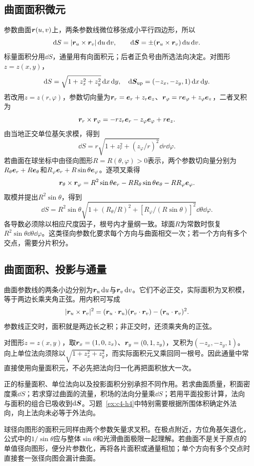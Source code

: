 \subsection{曲面面积微元}
参数曲面$\bm{r}(u,v)$上，两条参数线微位移张成小平行四边形，所以
\[\mathop{}\!\mathrm d S=|\bm{r}_u\times\bm{r}_v|\mathop{}\!\mathrm d u\mathop{}\!\mathrm d v,\qquad
\mathop{}\!\mathrm d\bm{S}=\pm(\bm{r}_u\times\bm{r}_v)\mathop{}\!\mathrm d u\mathop{}\!\mathrm d v.
\]
标量面积分用$\dd S$，通量用有向面积元；后者正负号由所选法向决定。对图形$z=z(x,y)$，
\[\mathop{}\!\mathrm d S=\sqrt{1+z_x^2+z_y^2}\mathop{}\!\mathrm d x\mathop{}\!\mathrm d y,\quad
\mathop{}\!\mathrm d\bm{S}_{\rm up}=(-z_x,-z_y,1)\mathop{}\!\mathrm d x\mathop{}\!\mathrm d y.
\]
若改用$z=z(r,\varphi)$，参数切向量为$\bm{r}_r=\bm{e}_r+z_r\bm{e}_z$、$\bm{r}_\varphi=r\bm{e}_\varphi+z_\varphi\bm{e}_z$，二者叉积为
\[\bm{r}_r\times\bm{r}_\varphi
=-rz_r\bm{e}_r-z_\varphi\bm{e}_\varphi+r\bm{e}_z.\]
由当地正交单位基矢求模，得到
\[\dd S=r\sqrt{1+z_r^2+(z_\varphi/r)^2}\dd r\dd\varphi.
\]
若曲面在球坐标中由径向图形$R=R(\theta,\varphi)>0$表示，两个参数切向量分别为$R_\theta\bm{e}_r+R\bm{e}_\theta$和$R_\varphi\bm{e}_r+R\sin\theta\bm{e}_\varphi$。逐项叉乘得
\[\bm{r}_\theta\times\bm{r}_\varphi
=R^2\sin\theta\bm{e}_r-RR_\theta\sin\theta\bm{e}_\theta-RR_\varphi\bm{e}_\varphi.\]
取模并提出$R^2\sin\theta$，得到
\[\boxed{\dd S=R^2\sin\theta\sqrt{1+(R_\theta/R)^2+[R_\varphi/(R\sin\theta)]^2}\dd\theta\dd\varphi}.
\]
各导数必须除以相应尺度因子，根号内才量纲一致。球面$R$为常数时恢复$R^2\sin\theta\dd\theta\dd\varphi$。这类径向参数化要求每个方向与曲面相交一次；若一个方向有多个交点，需要分片积分。

\subsection{曲面面积、投影与通量}
曲面参数线的两条小边分别为$\bm{r}_u\mathop{}\!\mathrm d u$与$\bm{r}_v\mathop{}\!\mathrm d v$。它们不必正交，实际面积为叉积模，等于两边长乘夹角正弦。用内积可写成
\[|\bm{r}_u\times\bm{r}_v|^2
=(\bm{r}_u\cdot\bm{r}_u)(\bm{r}_v\cdot\bm{r}_v)
-(\bm{r}_u\cdot\bm{r}_v)^2.\]
参数线正交时，面积就是两边长之积；非正交时，还须乘夹角的正弦。

对图形$z=z(x,y)$，取$\bm{r}_x=(1,0,z_x)$、$\bm{r}_y=(0,1,z_y)$，叉积为$(-z_x,-z_y,1)$。向上单位法向须除以$\sqrt{1+z_x^2+z_y^2}$，而实际面积元又乘回同一根号。因此通量中常直接使用向量面积元，不必先把法向归一化再把面积放大一次。

正的标量面积、单位法向以及投影面积分别承担不同作用。若求曲面质量，积面密度乘$\dd S$；若求穿过曲面的流量，积场的法向分量乘$\dd S$；若用平面投影计算，法向与面积的组合已吸收到$\mathop{}\!\mathrm d\bm{S}$。习题~\ref{ex:c4-h4}中特别需要根据所围体积确定外法向，向上法向未必等于外法向。

球径向图形的面积元同样由两个参数矢量求叉积。在极点附近，方位角基矢退化，公式中的$1/\sin\theta$应与整体$\sin\theta$和光滑曲面极限一起理解。若曲面不是关于原点的单值径向图形，便分片参数化，再将各片面积或通量相加；单个方向有多个交点时直接套一张径向图会漏计曲面。


